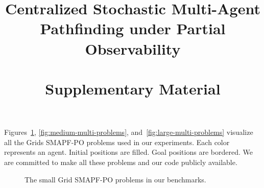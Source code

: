 \documentclass[letterpaper]{article} %
\title{Centralized Stochastic Multi-Agent Pathfinding under Partial Observability \\ ~ \\ Supplementary Material}
\begin{document}
\maketitle


Figures~\ref{fig:small-multi-problems}, \ref{fig:medium-multi-problems}, and~\ref{fig:large-multi-problems} visualize all the Grids SMAPF-PO problems used in our experiments. Each color represents an agent. Initial positions are filled. Goal positions are bordered. We are committed to make all these problems and our code publicly available. 


\begin{figure}
    \caption{The small Grid SMAPF-PO problems in our benchmarks.}
    \label{fig:small-multi-problems}        
\end{figure}
\end{document}
